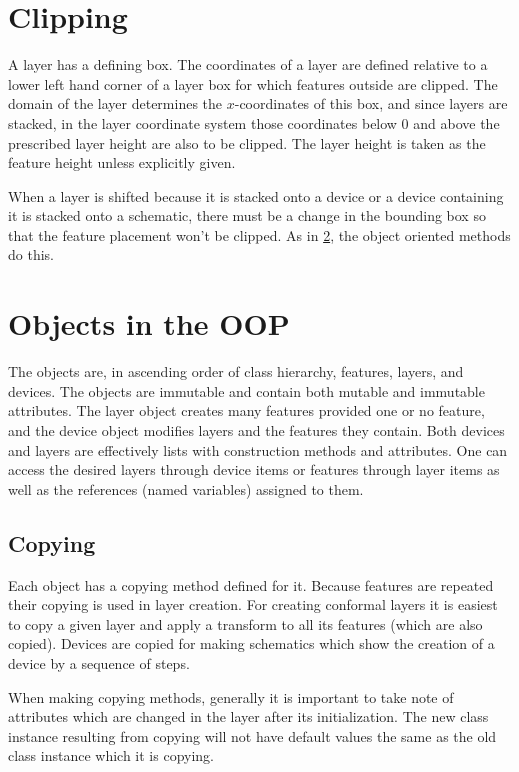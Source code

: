 \documentclass{article}
\begin{document}
\section{Clipping}
A layer has a defining box. The coordinates of a layer are defined relative to a lower left hand corner of a layer box for which features outside are clipped. The domain of the layer determines the $x$-coordinates of this box, and since layers are stacked, in the layer coordinate system those coordinates below 0 and above the prescribed layer height are also to be clipped. The layer height is taken as the feature height unless explicitly given.

When a layer is shifted because it is stacked onto a device or a device containing it is stacked onto a schematic, there must be a change in the bounding box so that the feature placement won't be clipped. As in \ref{sec:oop}, the object oriented methods do this.

\section{Objects in the OOP}\label{sec:oop}
The objects are, in ascending order of class hierarchy, features, layers, and devices. The objects are immutable and contain both mutable and immutable attributes. The layer object creates many features provided one or no feature, and the device object modifies layers and the features they contain. Both devices and layers are effectively lists with construction methods and attributes. One can access the desired layers through device items or features through layer items as well as the references (named variables) assigned to them.

\subsection{Copying} 
Each object has a copying method defined for it. Because features are repeated their copying is used in layer creation. For creating conformal layers it is easiest to copy a given layer and apply a transform to all its features (which are also copied). Devices are copied for making schematics which show the creation of a device by a sequence of steps.

When making copying methods, generally it is important to take note of attributes which are changed in the layer after its initialization. The new class instance resulting from copying will not have default values the same as the old class instance which it is copying.
\end{document}
